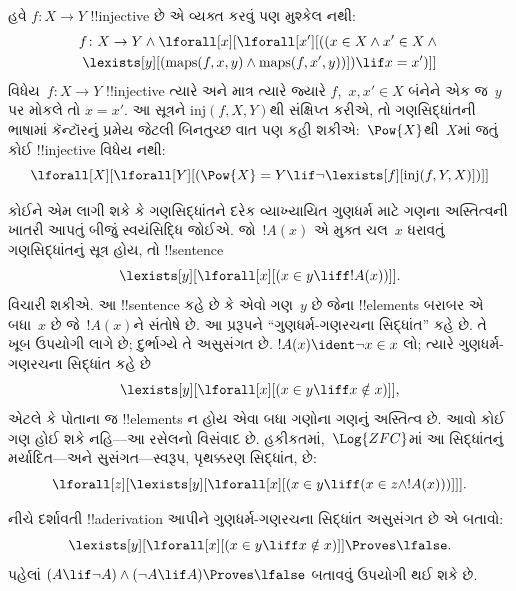 \documentclass[../../../include/open-logic-section]{subfiles}
\begin{document}
હવે $f\colon X\to Y$ !!{injective} છે એ વ્યક્ત કરવું પણ મુશ્કેલ નથી:
\begin{multline*}
 f \colon X \to Y \land \lforall[x][\lforall[x'][((x \in X \land x' \in
     X \land {} \\
 \lexists[y][(\mathrm{maps}(f, x, y) \land \mathrm{maps}(f,
        x', y))]) \lif x = x')]]
\end{multline*}
વિધેય~$f\colon X\to Y$ !!{injective} ત્યારે અને માત્ર ત્યારે જ્યારે
$f$,~$x,x'\in X$ બંનેને એક જ~$y$ પર મોકલે તો $x=x'$. આ સૂત્રને
$\mathrm{inj}(f,X,Y)$થી સંક્ષિપ્ત કરીએ, તો ગણસિદ્ધાંતની ભાષામાં
કૅન્ટૉરનું પ્રમેય જેટલી બિનતુચ્છ વાત પણ કહી શકીએ:~$\Pow{X}$થી~$X$માં
જતું કોઈ !!{injective} વિધેય નથી:
\[
\lforall[X][\lforall[Y][(\Pow{X} = Y \lif
    \lnot\lexists[f][\mathrm{inj}(f, Y, X)])]]
\]

કોઈને એમ લાગી શકે કે ગણસિદ્ધાંતને દરેક વ્યાખ્યાયિત ગુણધર્મ માટે ગણના
અસ્તિત્વની ખાતરી આપતું બીજું સ્વયંસિદ્ધિ જોઈએ. જો~$!A(x)$ એ મુક્ત
ચલ~$x$ ધરાવતું ગણસિદ્ધાંતનું સૂત્ર હોય, તો !!{sentence}
\[
\lexists[y][\lforall[x][(x \in y \liff !A(x))]].
\]
વિચારી શકીએ. આ !!{sentence} કહે છે કે એવો ગણ~$y$ છે જેના !!{element}s
બરાબર એ બધા~$x$ છે જે~$!A(x)$ને સંતોષે છે. આ પ્રરૂપને
``ગુણધર્મ-ગણરચના સિદ્ધાંત'' કહે છે. તે ખૂબ ઉપયોગી લાગે છે; દુર્ભાગ્યે
તે અસુસંગત છે. $!A(x)\ident\lnot x\in x$ લો; ત્યારે
ગુણધર્મ-ગણરચના સિદ્ધાંત કહે છે
\[
\lexists[y][\lforall[x][(x \in y \liff x \notin x)]],
\]
એટલે કે પોતાના જ !!{element}s ન હોય એવા બધા ગણોના ગણનું અસ્તિત્વ છે.
આવો કોઈ ગણ હોઈ શકે નહિ---આ રસેલનો વિસંવાદ છે. હકીકતમાં,~$\Log{ZFC}$માં
આ સિદ્ધાંતનું મર્યાદિત---અને સુસંગત---સ્વરૂપ, પૃથક્કરણ સિદ્ધાંત, છે:
\[
\lforall[z][\lexists[y][\lforall[x][(x \in y \liff (x \in z \land
      !A(x)))]]].
\]

\begin{prob}
નીચે દર્શાવતી !!a{derivation} આપીને ગુણધર્મ-ગણરચના સિદ્ધાંત અસુસંગત
છે એ બતાવો:
\[
\lexists[y][\lforall[x][(x \in y \liff x \notin x)]] \Proves \lfalse.
\]
પહેલાં $(A\lif\lnot A)\land(\lnot A\lif A)\Proves\lfalse$ બતાવવું
ઉપયોગી થઈ શકે છે.
\end{prob}
\end{document}

